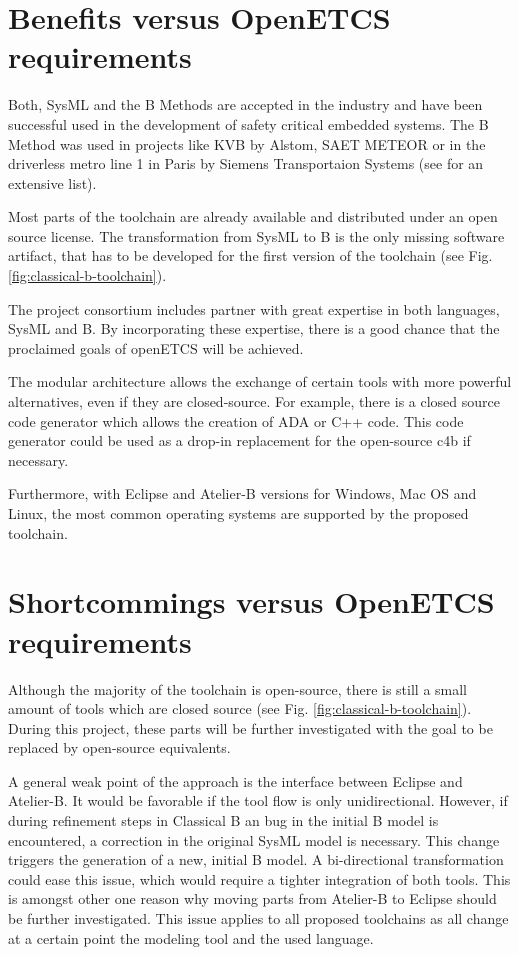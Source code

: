 \section{Benefits versus OpenETCS requirements}

Both, SysML and the B Methods are accepted in the industry and have
been successful used in the development of safety critical embedded
systems. The B Method was used in projects like KVB by Alstom, SAET
METEOR or in the driverless metro line 1 in Paris by Siemens
Transportaion Systems (see \citep{clearsy} for an extensive list).

Most parts of the toolchain are already available and distributed
under an open source license. The transformation from SysML to B is
the only missing software artifact, that has to be developed for the
first version of the toolchain (see
Fig. \ref{fig:classical-b-toolchain}).

The project consortium includes partner with great expertise in both
languages, SysML and B. By incorporating these expertise, there is a
good chance that the proclaimed goals of openETCS will be achieved.

The modular architecture allows the exchange of certain tools with
more powerful alternatives, even if they are closed-source. For
example, there is a closed source code generator which allows the
creation of ADA or C++ code. This code generator could be used as a
drop-in replacement for the open-source c4b if necessary.

Furthermore, with Eclipse and Atelier-B versions for Windows, Mac OS
and Linux, the most common operating systems are supported by the
proposed toolchain.

\section{Shortcommings versus OpenETCS requirements}

Although the majority of the toolchain is open-source, there is still
a small amount of tools which are closed source (see
Fig. \ref{fig:classical-b-toolchain}). During this project, these
parts will be further investigated with the goal to be replaced by
open-source equivalents.

A general weak point of the approach is the interface between Eclipse
and Atelier-B. It would be favorable if the tool flow is only
unidirectional. However, if during refinement steps in Classical B an
bug in the initial B model is encountered, a correction in the
original SysML model is necessary. This change triggers the generation
of a new, initial B model. A bi-directional transformation could ease
this issue, which would require a tighter integration of both
tools. This is amongst other one reason why moving parts from
Atelier-B to Eclipse should be further investigated. This issue
applies to all proposed toolchains as all change at a certain point
the modeling tool and the used language.

